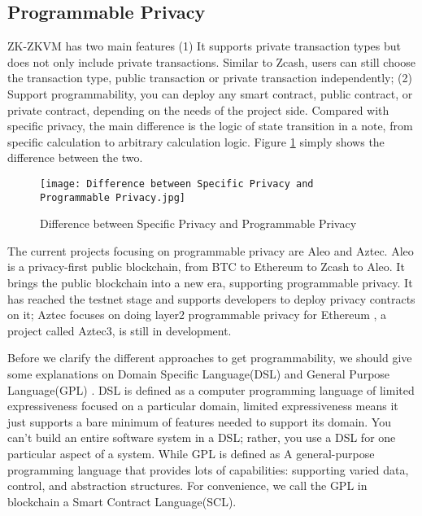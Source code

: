 \subsection{Programmable Privacy}

ZK-ZKVM has two main features (1) It supports private transaction types but does not only include private transactions. Similar to Zcash\cite{website:Zcash}, users can still 
choose the transaction type, public transaction or private transaction independently; 
(2) Support programmability, you can deploy any smart contract, public contract, or 
private contract, depending on the needs of the project side. Compared with specific 
privacy, the main difference is the logic of state transition in a note, from specific 
calculation to arbitrary calculation logic. Figure \ref{fig:Difference between Specific Privacy and Programmable Privacy} simply shows the difference 
between the two.
\begin{figure}[!ht]
    \centering
    \texttt{[image: Difference between Specific Privacy and Programmable Privacy.jpg]}
    \caption{Difference between Specific Privacy and Programmable Privacy}
    \label{fig:Difference between Specific Privacy and Programmable Privacy}
\end{figure}

The current projects focusing on programmable privacy are Aleo\cite{website:Aleo} and Aztec\cite{website:Aztec}. Aleo\cite{website:Aleo} is a 
privacy-first public blockchain, from BTC\cite{website:BTC} to Ethereum\cite{website:Ethereum} to Zcash\cite{website:Zcash} to Aleo\cite{website:Aleo}. It brings the public blockchain into a new era,
supporting programmable privacy. 
It has reached the testnet stage and supports developers to deploy privacy contracts on it; 
Aztec\cite{website:Aztec} focuses on doing layer2 programmable privacy for Ethereum\cite{website:Ethereum} , a project 
called Aztec3\cite{website:Aztec3}, is still in development.

Before we clarify the different approaches to get programmability, we should give some explanations on Domain Specific Language(DSL) \cite{website:DSL} and General Purpose Language(GPL) \cite{website:DSL}.
DSL\cite{website:DSL} is defined as a computer programming language of limited expressiveness focused on a particular domain, limited expressiveness means it just supports a bare minimum of features 
needed to support its domain. You can't build an entire software system in a DSL; rather, you use a DSL\cite{website:DSL} for one particular aspect of a system. While GPL\cite{website:DSL} is defined as A general-purpose programming language
that provides lots of capabilities: supporting varied data, control, and abstraction structures. For convenience, we call the GPL in blockchain a Smart Contract Language(SCL).

